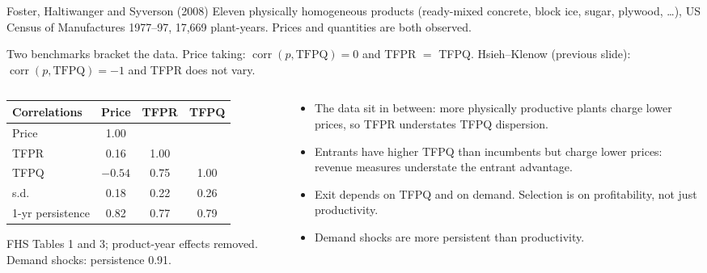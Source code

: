 \documentclass[aspectratio=169,10pt]{beamer}
\begin{document}
\begin{frame}{Foster, Haltiwanger and Syverson (2008)}
\small
Eleven physically homogeneous products (ready-mixed concrete, block ice, sugar, plywood, \ldots), US Census of Manufactures 1977--97, 17,669 plant-years. Prices and quantities are both observed.

Two benchmarks bracket the data. Price taking: $\operatorname{corr}(p, \text{TFPQ}) = 0$ and TFPR $=$ TFPQ. Hsieh--Klenow (previous slide): $\operatorname{corr}(p, \text{TFPQ}) = -1$ and TFPR does not vary.
\begin{columns}[T]
\begin{column}{0.5\textwidth}
\begin{center}
\scriptsize
\renewcommand{\arraystretch}{1.1}
\begin{tabular}{lccc}
\toprule
Correlations & Price & TFPR & TFPQ \\
\midrule
Price & 1.00 & & \\
TFPR & 0.16 & 1.00 & \\
TFPQ & $-0.54$ & 0.75 & 1.00 \\
\midrule
s.d. & 0.18 & 0.22 & 0.26 \\
1-yr persistence & 0.82 & 0.77 & 0.79 \\
\bottomrule
\end{tabular}

{\tiny FHS Tables 1 and 3; product-year effects removed. Demand shocks: persistence 0.91.}
\end{center}
\end{column}
\begin{column}{0.48\textwidth}
\begin{itemize}
\item The data sit in between: more physically productive plants charge \alert{lower} prices, so TFPR understates TFPQ dispersion.
\item Entrants have higher TFPQ than incumbents but charge lower prices: revenue measures understate the entrant advantage.
\item Exit depends on TFPQ \alert{and} on demand. Selection is on profitability, not just productivity.
\item Demand shocks are more persistent than productivity.
\end{itemize}
\end{column}
\end{columns}
\end{frame}
\end{document}
